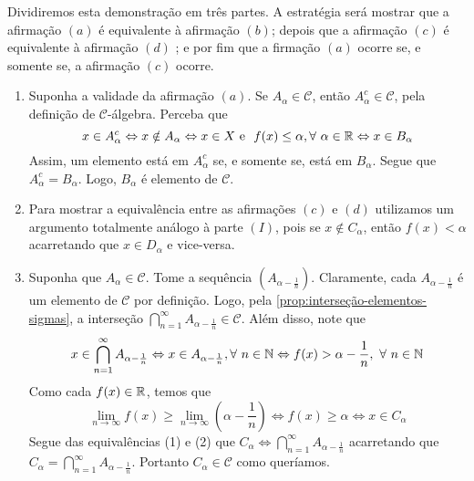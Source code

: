 \begin{prova}
    Dividiremos esta demonstração em três partes. A estratégia será mostrar que a afirmação $(a)$ é equivalente à afirmação $(b)$; depois que a afirmação $(c)$ é equivalente à afirmação $(d)$ ; e por fim que a firmação $(a)$ ocorre se, e somente se, a afirmação $(c)$ ocorre. 
    \begin{enumerate}[label* = (\Roman*)]
        \item Suponha a validade da afirmação $(a)$. Se $A_\alpha \in \mathcal{C}$, então $A_\alpha^c \in \mathcal{C}$, pela definição de $\mathcal{C}$-álgebra.
	    Perceba que 
	    $$
	    x \in A_\alpha^c \Leftrightarrow   x \notin A_\alpha\\
	    \Leftrightarrow  x \in X \textrm{\ e \ } f(x) \leq \alpha, \forall\ \alpha \in \mathbb{R}
	    \Leftrightarrow x \in B_\alpha    
		$$ Assim, um elemento está em $A_\alpha^c$ se, e somente se, está em $B_\alpha$. Segue que $A_\alpha^c = B_\alpha$. Logo, $B_\alpha$ é elemento de $\mathcal{C}$.
		\item Para mostrar a equivalência entre as afirmações $(c)$ e $(d)$ utilizamos um argumento totalmente análogo à parte $(I)$, pois se $x \notin C_\alpha$, então $f(x) < \alpha$ acarretando que $x \in D_\alpha$ e vice-versa.
		\item Suponha que $A_\alpha \in \mathcal{C}$. Tome a sequência $\left(A_{\alpha -\frac{1}{n}}\right)$. Claramente, cada $A_{\alpha - \frac{1}{n}}$ é um elemento de $\mathcal{C}$ por definição.
		Logo, pela \ref{prop:interseção-elementos-sigmas}, a interseção $\displaystyle \bigcap_{n = 1}^\infty A_{\alpha -\frac{1}{n}} \in \mathcal{C}$.
		Além disso, note que 
		\begin{equation}
			x \in \displaystyle \bigcap_{n = 1}^\infty A_{\alpha -\frac{1}{n}}
			\Leftrightarrow
		 	x \in A_{\alpha - \frac{1}{n}}, \forall \ n \in \operatorname{\mathbb{N}}
			\Leftrightarrow
			f(x)> \alpha -\dfrac{1}{n},  \ \forall \ n \in \operatorname{\mathbb{N}}
		\end{equation}
		Como cada $f(x) \in \mathbb{R}$, temos que
		\begin{equation}
			\lim_{n \to \infty} f(x) \geq \lim_{n \to \infty} \left(\alpha - \dfrac{1}{n}\right)
			\Leftrightarrow
			f(x) \geq \alpha
			\Leftrightarrow
			x \in C_\alpha
		\end{equation}
		Segue das equivalências (1) e (2) que $C_\alpha \Leftrightarrow \displaystyle \bigcap_{n = 1}^\infty A_{\alpha -\frac{1}{n}}$
		acarretando que $C_\alpha = \displaystyle \bigcap_{n = 1}^\infty A_{\alpha -\frac{1}{n}} $.
		Portanto $C_\alpha \in \mathcal{C}$ como queríamos.
   \end{enumerate}
	

\end{prova}
